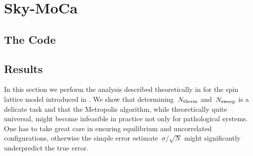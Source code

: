 %
\chapter{Sky-MoCa}\label{chap:2}
%
%
\section{The Code}\label{sec:code}
%
%
\section{Results}\label{sec:results}
%
In this section we perform the analysis described theoretically in
 for the spin lattice model introduced in
. We show that determining~$N_{\mathrm{therm}}$ and~$N_{\mathrm{sweep}}$ is a
delicate task and that the Metropolis algorithm, while theoretically quite
universal, might become infeasible in practice not only for pathological
systems. One has to take great care in ensuring equilibrium and uncorrelated
configurations, otherwise the simple error estimate~$\sigma/\sqrt{N}$ might
significantly underpredict the true error.

